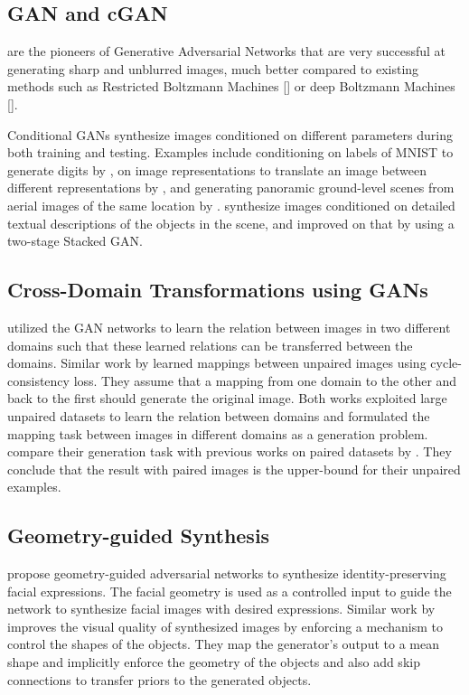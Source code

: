\documentclass[times,twocolumn,final,authoryear]{elsarticle_modified}
\begin{document}
\vspace{-5pt}

\subsection{GAN and cGAN}
\cite{goodfellow2014generative} are the pioneers of Generative Adversarial Networks that are very successful at generating sharp and unblurred images, much better compared to existing methods such as Restricted Boltzmann Machines [\cite{Hinton:2006:FLA:1161603.1161605, Smolensky:1986:IPD:104279.104290}] or deep Boltzmann Machines [\cite{salakhutdinov2009deep}]. 

Conditional GANs synthesize images conditioned on different parameters during both training and testing. Examples include conditioning on labels of MNIST to generate digits by \cite{DBLP:journals/corr/MirzaO14}, on image representations to translate an image between different representations by \cite{pix2pix2017}, and generating panoramic ground-level scenes from aerial images of the same location by \cite{zhai2017crossview}. \cite{pmlr-v48-reed16} synthesize images conditioned on detailed textual descriptions of the objects in the scene, and \cite{han2017stackgan} improved on that by using a two-stage Stacked GAN. 

\vspace{-5pt}

\subsection{Cross-Domain Transformations using GANs}
\cite{pmlr-v70-kim17a} utilized the GAN networks to learn the relation between images in two different domains such that these learned relations can be transferred between the domains. Similar work by \cite{CycleGAN2017} learned mappings between unpaired images using cycle-consistency loss. They assume that a mapping from one domain to the other and back to the first should generate the original image. Both works exploited large unpaired datasets to learn the relation between domains and formulated the mapping task between images in different domains as a generation problem. \cite{CycleGAN2017} compare their generation task with previous works on paired datasets by \cite{pix2pix2017}. They conclude that the result with paired images is the upper-bound for their unpaired examples. 

\vspace{-5pt}

\subsection{Geometry-guided Synthesis}
\cite{songgeometry} propose geometry-guided adversarial networks to synthesize identity-preserving facial expressions. The facial geometry is used as a controlled input to guide the network to synthesize facial images with desired expressions.
Similar work by \cite{kossaifi2017gagan} improves the visual quality of synthesized images by enforcing a mechanism to control the shapes of the objects. They map the generator's output to a mean shape and implicitly enforce the geometry of the objects and also add skip connections to transfer priors to the generated objects.
\end{document}
